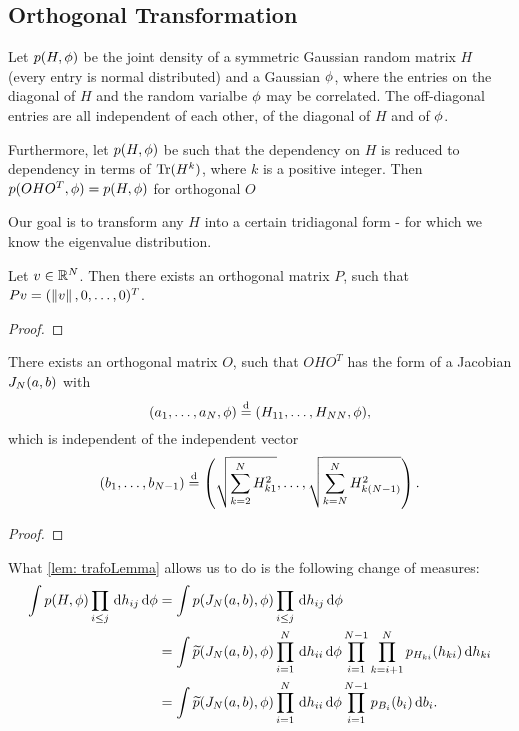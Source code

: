 \subsection{Orthogonal Transformation}

Let $p(H, \phi)$ be the joint density of a symmetric Gaussian random matrix $H$ (every entry is normal distributed) and a Gaussian $\phi$, where the entries on the diagonal of $H$ and the random varialbe $\phi$ may be correlated. The off-diagonal entries are all independent of each other, of the diagonal of $H$ and of $\phi$.

Furthermore, let $p(H,\phi)$ be such that the dependency on $H$ is reduced to dependency in terms of $\operatorname{Tr}(H^k)$, where $k$ is a positive integer. Then $p(OHO^T, \phi) = p(H,\phi)$ for orthogonal $O$ 

Our goal is to transform any $H$ into a certain tridiagonal form - for which we know the eigenvalue distribution.

\begin{lemma}
    Let $v \in \mathbb{R}^N$. Then there exists an orthogonal matrix $P$, such that $Pv = (\left\| v \right\|, 0, \ldots, 0)^T$.
\end{lemma}
\begin{proof}
\end{proof}

\begin{lemma}\label{lem: trafoLemma}
    There exists an orthogonal matrix $O$, such that $OHO^T$ has the form of a Jacobian $J_N(a,b)$ with 
    $$(a_1, \ldots, a_N, \phi) \overset{\text{d}}{=} (H_{11}, \ldots, H_{N N}, \phi),$$ which is independent of the independent vector 
    $$(b_1, \ldots, b_{N-1}) \overset{\text{d}}{=} \left( \sqrt{\sum_{k=2}^{N} H_{k 1}^2}, \ldots, \sqrt{\sum_{k=N}^{N} H_{k (N-1)}^2} \right).$$
\end{lemma}
\begin{proof}
\end{proof}

What \ref{lem: trafoLemma} allows us to do is the following change of measures:
\begin{equation}\label{eq: trafoEquation}
    \begin{split}
        \int p(H,\phi) \prod_{i\leq j} \,\text{d} h_{ij} \,\text{d} \phi
        & = \int p(J_N(a,b), \phi) \prod_{i\leq j} \,\text{d} h_{ij} \,\text{d} \phi \\
        & = \int \widetilde{p}(J_N(a,b), \phi) 
        \prod_{i=1}^N \,\text{d} h_{i i} \,\text{d} \phi 
        \prod_{i=1}^{N-1} \prod_{k=i+1}^{N} p_{H_{k i}}(h_{k i}) \,\text{d} h_{k i}\\
        & = \int \widetilde{p}(J_N(a,b), \phi) 
        \prod_{i=1}^N \,\text{d} h_{i i} \,\text{d} \phi 
        \prod_{i=1}^{N-1} p_{B_i}(b_i) \,\text{d} b_i .
    \end{split}
\end{equation}

